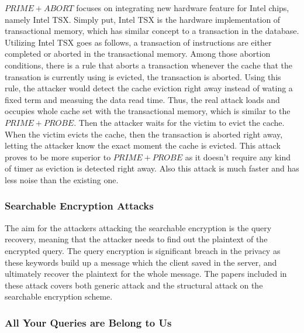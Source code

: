 \documentclass[a4paper]{article}
\begin{document}
$PRIME+ABORT$ focuses on integrating new hardware feature for Intel chips, namely Intel TSX. Simply put, Intel TSX is the hardware implementation of transactional memory, which has similar concept to a transaction in the database. Utilizing Intel TSX goes as follows, a transaction of instructions are either completed or aborted in the transactional memory. Among those abortion conditions, there is a rule that aborts a transaction whenever the cache that the transation is currently using is evicted, the transaction is aborted. Using this rule, the attacker would detect the cache eviction right away instead of wating a fixed term and measuing the data read time. Thus, the real attack loads and occupies whole cache set with the transactional memory, which is similar to the $PRIME+PROBE$. Then the attacker waits for the victim to evict the cache. When the victim evicts the cache, then the transaction is aborted right away, letting the attacker know the exact moment the cache is evicted. This attack proves to be more superior to $PRIME+PROBE$ as it doesn't require any kind of timer as eviction is detected right away. Also this attack is much faster and has less noise than the existing one.

\subsubsection{Searchable Encryption Attacks}

The aim for the attackers attacking the searchable encryption is the query recovery, meaning that the attacker needs to find out the plaintext of the encrypted query. The query encryption is significant breach in the privacy as these keywords build up a message which the client saved in the server, and ultimately recover the plaintext for the whole message. The papers included in these attack covers both generic attack and the structural attack on the searchable encryption scheme.

\subsubsection*{All Your Queries are Belong to Us}
\end{document}
